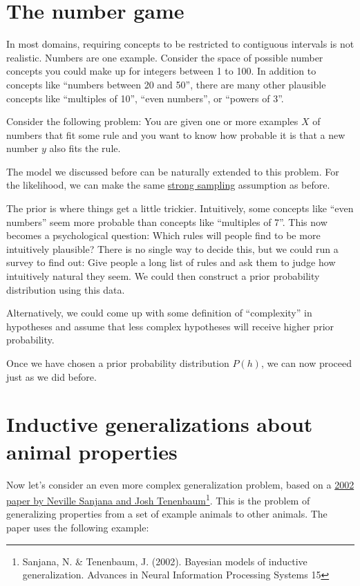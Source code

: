 \documentclass[
  letterpaper,
  DIV=11,
  numbers=noendperiod]{scrreprt}
\begin{document}
\section{The number game 🔢}\label{the-number-game}

In most domains, requiring concepts to be restricted to contiguous
intervals is not realistic. Numbers are one example. Consider the space
of possible number concepts you could make up for integers between 1 to
100. In addition to concepts like ``numbers between 20 and 50'', there
are many other plausible concepts like ``multiples of 10'', ``even
numbers'', or ``powers of 3''.

Consider the following problem: You are given one or more examples \(X\)
of numbers that fit some rule and you want to know how probable it is
that a new number \(y\) also fits the rule.

The model we discussed before can be naturally extended to this problem.
For the likelihood, we can make the same
\hyperref[weak-strong-sampling]{strong sampling} assumption as before.

The prior is where things get a little trickier. Intuitively, some
concepts like ``even numbers'' seem more probable than concepts like
``multiples of 7''. This now becomes a psychological question: Which
rules will people find to be more intuitively plausible? There is no
single way to decide this, but we could run a survey to find out: Give
people a long list of rules and ask them to judge how intuitively
natural they seem. We could then construct a prior probability
distribution using this data.

Alternatively, we could come up with some definition of ``complexity''
in hypotheses and assume that less complex hypotheses will receive
higher prior probability.

Once we have chosen a prior probability distribution \(P(h)\), we can
now proceed just as we did before.

\section{Inductive generalizations about animal properties
🐴}\label{inductive-generalizations-about-animal-properties}

Now let's consider an even more complex generalization problem, based on
a \href{http://sanjanalab.org/reprints/Sanjana_NIPS_2002.pdf}{2002 paper
by Neville Sanjana and Josh Tenenbaum}\footnote{Sanjana, N. \&
  Tenenbaum, J. (2002). Bayesian models of inductive generalization.
  Advances in Neural Information Processing Systems 15}. This is the
problem of generalizing properties from a set of example animals to
other animals. The paper uses the following example:
\end{document}

